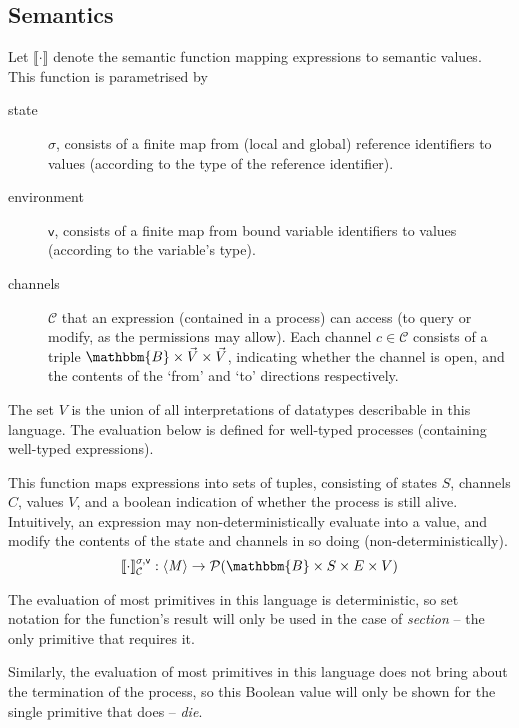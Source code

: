 \documentclass{article}
\newcommand{\m}[1]{\ensuremath{\llbracket #1\rrbracket}}
\begin{document}
\subsection{Semantics}
\newcommand{\state}{\ensuremath{\sigma}}
\newcommand{\envir}{\ensuremath{\mathsf{v}}}
\newcommand{\channels}{\ensuremath{\mathcal{C}}}
Let \m{\cdot} denote the semantic function mapping expressions to semantic
values. This function is parametrised by
\begin{description}
  \item [state] $\state$, consists of a finite map from (local and global)
    reference identifiers to values (according to the type of the reference
    identifier).
  \item [environment] $\envir$, consists of a finite map from bound variable
    identifiers to values (according to the variable's type).
  \item [channels] $\channels$ that an expression (contained in a process) can access (to
query or modify, as the permissions may allow). Each channel $c \in \channels$
consists of a triple $\mathbbm{B} \times \vec{V} \times \vec{V}$, indicating
whether the channel is open, and the contents of the `from' and `to' directions
respectively.
\end{description}

The set $V$ is the union of all interpretations of datatypes describable in this
language. The evaluation below is defined for well-typed processes (containing
well-typed expressions).

This function maps expressions into sets of tuples, consisting of states $S$,
channels $C$, values $V$, and a boolean indication of whether the process is
still alive. Intuitively, an expression may non-deterministically
evaluate into a value, and modify the contents of the state and channels in so
doing (non-deterministically).
\[
  \m{\cdot}^{\state, \envir}_\channels : \syntaxcat{M} \to
    \mathcal{P}(\mathbbm{B} \times S \times E \times V)
\]

The evaluation of most primitives in this language is deterministic, so set
notation for the function's result will only be used in the case of
\emph{section} -- the only primitive that requires it.

Similarly, the evaluation of most primitives in this language does not bring
about the termination of the process, so this Boolean value will only be shown
for the single primitive that does -- \emph{die}.

\newcommand{\defn}{\ensuremath{\stackrel{\mathrm{def}}{=}}}
\end{document}
